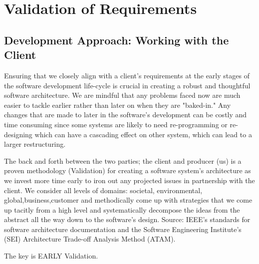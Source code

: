 \documentclass{article}
\begin{document}
\section{Validation of Requirements}
\subsection{Development Approach: Working with the Client}
Ensuring that we closely align with a client's requirements at the early stages of the software development life-cycle is crucial in creating a robust and thoughtful software architecture. We are mindful that any problems faced now are much easier to tackle earlier rather than later on when they are "baked-in." Any changes that are made to later in the software's development can be costly and time consuming since some systems are likely to need re-programming or re-designing which can have a cascading effect on other system, which can lead to a larger restructuring. 

The back and forth between the two parties; the client and producer (us) is a proven methodology (Validation) for creating a software system's architecture as we invest more time early to iron out any projected issues in partnership with the client. We consider all levels of domains: societal, environmental, global,business,customer and methodically come up with strategies that we come up tacitly from a high level and systematically decompose the ideas from the abstract all the way down to the software's design. Source: IEEE's standards for software architecture documentation and the Software Engineering Institute's (SEI) Architecture Trade-off Analysis Method (ATAM).

The key is EARLY Validation.
\end{document}
